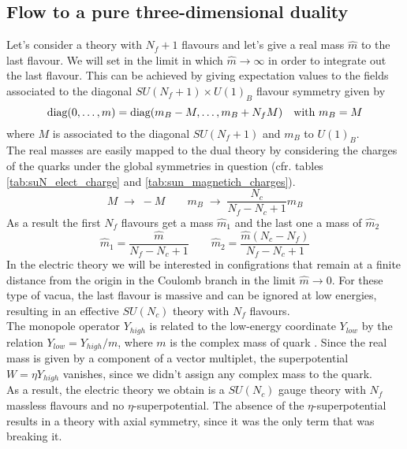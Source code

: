 \subsection{Flow to a pure three-dimensional duality}
\label{sec:seib_4dto3d_flow_massive}
Let's consider a theory with $N_f + 1$ flavours and let's give a real mass $\hat{m}$ to the last flavour.
We will set in the limit in which $\hat{m} \rightarrow \infty$ in order to integrate out the last flavour.
This can be achieved by giving expectation values to the fields associated to the diagonal $SU(N_f +1 ) \times U(1)_B$ flavour symmetry given by
\begin{equation}
  \hbox{diag}(0, \dots , m ) = \mbox{diag} (m_B - M, \dots , m_B + N_f M)  \quad \hbox{with } m_B = M 
   \end{equation}   
   where $M$ is associated to the diagonal $SU(N_f+1)$ and $m_B$ to $U(1)_B$.\\
 The real masses are easily mapped to the dual theory by considering the charges of the quarks under the global symmetries in question (cfr. tables \eqref{tab:suN_elect_charge} and \eqref{tab:sun_magnetich_charges}).
 \begin{equation}
  M \; \rightarrow \;  - M \qquad m_B \; \rightarrow \; \frac{N_c}{N_f - N_c +1} m_B
 \end{equation}
 As a result the first $N_f$ flavours get a mass $\hat{m}_1$ and the last one a mass of $\hat{m}_2$
 \begin{equation}
  \hat{m}_1 = \frac{ \hat{m}}{N_f - N_c +1} \qquad \hat{m}_2 = \frac{ \hat{m} (N_c - N_f)}{N_f -N_c +1 }
 \end{equation}
In the electric theory we will be interested in configrations that remain at a finite distance from the origin in the Coulomb branch in the limit $\hat{m} \rightarrow 0 $.
For these type of vacua, the last flavour is massive and can be ignored at low energies, resulting in an effective $SU(N_c)$ theory with $N_f$ flavours.\\
The monopole operator $Y_{high}$ is related to the low-energy coordinate $Y_{low}$ by the relation $Y_{low} = Y_{high}/ m $, where $m$ is the complex mass of quark \cite{Aharony:2013dha}.
Since the real mass is given by a component of a vector multiplet, the superpotential $W = \eta Y_{high}$ vanishes, since we didn't assign any complex mass to the quark.\\
As a result, the electric theory we obtain is a $SU(N_c)$ gauge theory with $N_f$ massless flavours and no $\eta$-superpotential. 
The absence of the $\eta$-superpotential results in a theory with axial symmetry, since it was the only term that was breaking it.
